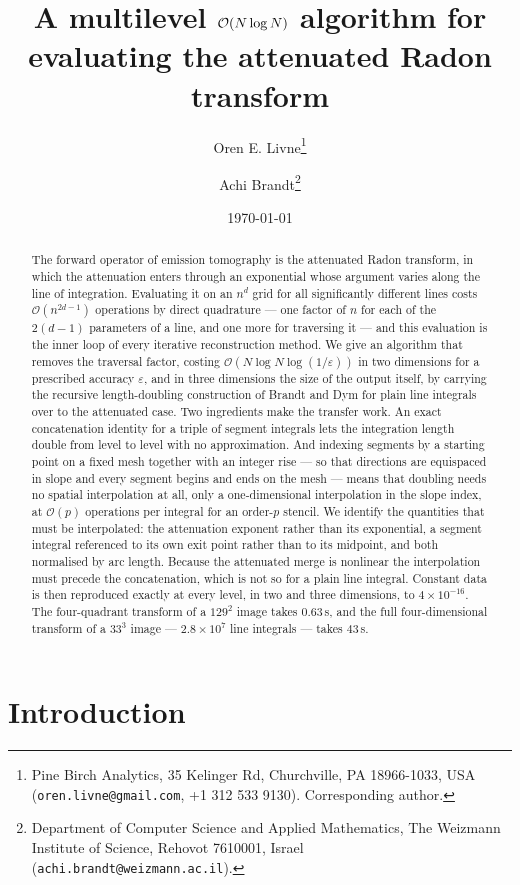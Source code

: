 \documentclass[11pt]{article}
\title{A multilevel $\bigO(N\log N)$ algorithm for evaluating the
attenuated Radon transform}
\author{%
  Oren E. Livne\thanks{Pine Birch Analytics, 35 Kelinger Rd, Churchville,
    PA 18966-1033, USA
    (\texttt{oren.livne@gmail.com}, +1 312 533 9130). Corresponding author.}
  \and
  Achi Brandt\thanks{Department of Computer Science and Applied Mathematics,
    The Weizmann Institute of Science, Rehovot 7610001, Israel
    (\texttt{achi.brandt@weizmann.ac.il}).}
}
\date{\today}
\newcommand{\bigO}{\mathcal{O}}
\begin{document}
\maketitle

\begin{abstract}
The forward operator of emission tomography is the attenuated Radon transform,
in which the attenuation enters through an exponential whose argument varies
along the line of integration. Evaluating it on an $n^d$ grid for all
significantly different lines costs $\bigO(n^{2d-1})$ operations by direct
quadrature --- one factor of $n$ for each of the $2(d-1)$ parameters of a line,
and one more for traversing it --- and this evaluation is the inner loop of
every iterative reconstruction method. We give an
algorithm that removes the traversal factor, costing
$\bigO(N \log N \log(1/\varepsilon))$ in two dimensions for a prescribed
accuracy $\varepsilon$, and in three dimensions the size of the output itself,
by carrying the recursive length-doubling construction of Brandt
and Dym for plain line integrals over to the attenuated case. Two ingredients
make the transfer work. An exact concatenation identity for a triple of segment
integrals lets the integration length double from level to level with no
approximation. And indexing segments by a starting point on a fixed mesh
together with an integer rise --- so that directions are equispaced in slope and
every segment begins and ends on the mesh --- means that doubling needs no
spatial interpolation at all, only a one-dimensional interpolation in the slope
index, at $\bigO(p)$ operations per integral for an order-$p$ stencil. We
identify the quantities that must be interpolated: the attenuation exponent
rather than its exponential, a segment integral referenced to its own exit point
rather than to its midpoint, and both normalised by arc length. Because the
attenuated merge is nonlinear the interpolation must precede the concatenation,
which is not so for a plain line integral. Constant data is then reproduced
exactly at every level, in two and three dimensions, to $4\times10^{-16}$. The
four-quadrant transform of a $129^2$ image takes $0.63$\,s, and the full
four-dimensional transform of a $33^3$ image --- $2.8\times10^7$ line integrals
--- takes $43$\,s.
\end{abstract}

\section{Introduction}
\label{sec:intro}
\end{document}
